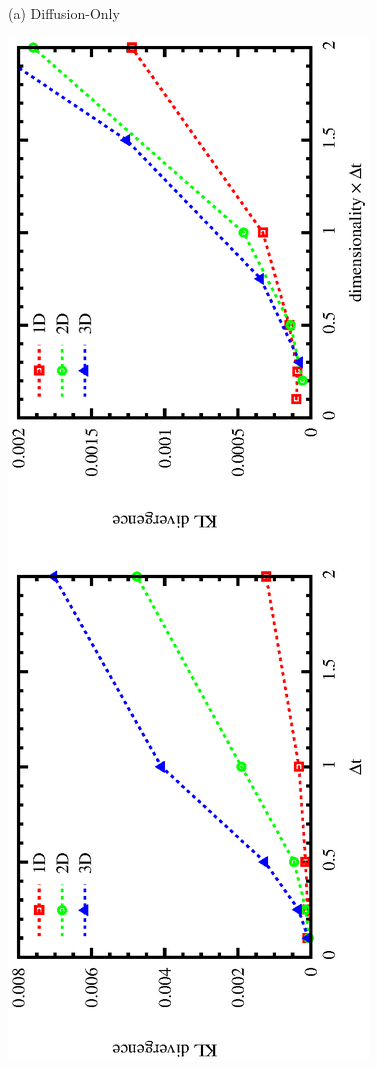 \documentclass{article}
\begin{document}
\begin{figure}
\begin{center}
\\
\vspace{5mm}
(a) Diffusion-Only
\vspace{-5mm}
\end{center}
\includegraphics[angle=270,width=\linewidth]{fig1/KLdiv_diff.eps}

\end{figure}
\end{document}
